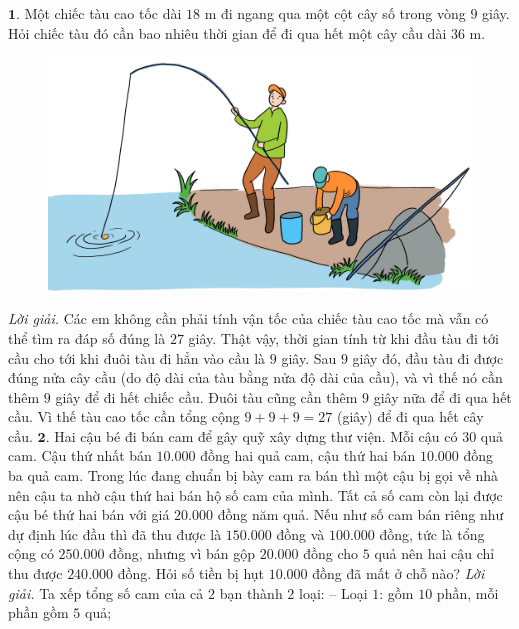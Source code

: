 \begin{multicols}{2}
	$\pmb{1.}$ Một chiếc tàu cao tốc dài $18$ m đi ngang qua một cột cây số trong vòng $9$ giây. Hỏi chiếc tàu đó cần bao nhiêu thời gian để đi qua hết một cây cầu dài $36$ m. 
	\begin{figure}[H]
		\centering
		\vspace*{-10pt}
		\captionsetup{labelformat= empty, justification=centering}
		\includegraphics[width=1\linewidth]{Pi10_ToanBi_Bai1}
		\vspace*{-15pt}
	\end{figure}
	\textit{Lời giải.} 	Các em không cần phải tính vận tốc của chiếc tàu cao tốc mà vẫn có thể tìm ra đáp số đúng là $27$ giây. Thật vậy, thời gian tính từ khi đầu tàu đi tới cầu cho tới khi đuôi tàu đi hẳn vào cầu là $9$ giây. Sau $9$ giây đó, đầu tàu đi được đúng nửa cây cầu (do độ dài của tàu bằng nửa độ dài của cầu), và vì thế nó cần thêm $9$ giây để đi hết chiếc cầu. Đuôi tàu cũng cần thêm $9$ giây nữa để đi qua hết cầu. Vì thế tàu cao tốc cần tổng cộng $9+9+9= 27$ (giây) để đi qua hết cây cầu.
	\vskip 0.1cm
	$\pmb{2.}$ Hai cậu bé đi bán cam để gây quỹ xây dựng thư viện. Mỗi cậu có $30$ quả cam. Cậu thứ nhất bán  $10{.}000$ đồng hai quả cam, cậu thứ hai bán $10{.}000$ đồng ba quả cam. Trong lúc đang chuẩn bị bày cam ra bán thì một cậu bị gọi về nhà nên cậu ta nhờ cậu thứ hai bán hộ số cam của mình. Tất cả số cam còn lại được cậu bé thứ hai bán với giá $20{.}000$ đồng năm quả. Nếu như số cam bán riêng như dự định lúc đầu thì đã thu được là $150{.}000$ đồng và $100{.}000$ đồng, tức là tổng cộng có $250{.}000$ đồng, nhưng vì bán gộp $20{.}000$ đồng cho $5$ quả nên  hai cậu chỉ thu được $240{.}000$ đồng. Hỏi số tiền bị hụt $10{.}000$ đồng đã mất ở chỗ nào?
	\vskip 0.1cm
	\textit{Lời giải.} Ta xếp tổng số cam của cả $2$ bạn thành $2$ loại:
	\vskip 0.1cm
	-- Loại $1$: gồm $10$ phần, mỗi phần gồm $5$ quả;

\end{multicols}
